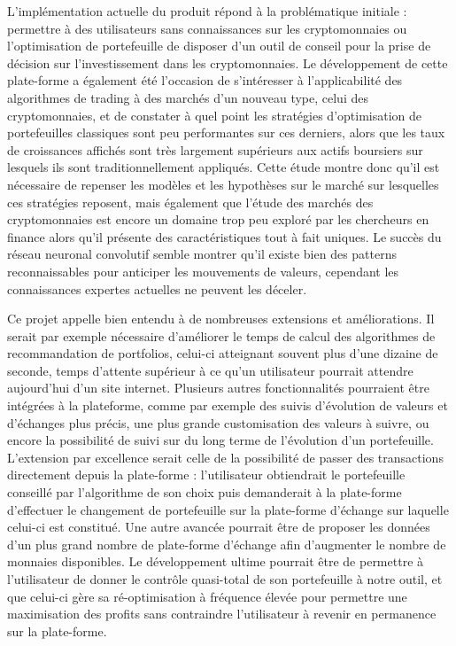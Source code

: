 \documentclass[a4paper, 10pt]{article}
\begin{document}
L'implémentation actuelle du produit répond à la problématique initiale : permettre à des utilisateurs sans connaissances sur les cryptomonnaies ou l'optimisation de portefeuille de disposer d'un outil de conseil pour la prise de décision sur l'investissement dans les cryptomonnaies. Le développement de cette plate-forme a également été l'occasion de s'intéresser à l'applicabilité des algorithmes de trading à des marchés d'un nouveau type, celui des cryptomonnaies, et de constater à quel point les stratégies d'optimisation de portefeuilles classiques sont peu performantes sur ces derniers, alors que les taux de croissances affichés sont très largement supérieurs aux actifs boursiers sur lesquels ils sont traditionnellement appliqués. Cette étude montre donc qu'il est nécessaire de repenser les modèles et les hypothèses sur le marché sur lesquelles ces stratégies reposent, mais également que l'étude des marchés des cryptomonnaies est encore un domaine trop peu exploré par les chercheurs en finance alors qu'il présente des caractéristiques tout à fait uniques. Le succès du réseau neuronal convolutif semble montrer qu'il existe bien des patterns reconnaissables pour anticiper les mouvements de valeurs, cependant les connaissances expertes actuelles ne peuvent les déceler.

Ce projet appelle bien entendu à de nombreuses extensions et améliorations. Il serait par exemple nécessaire d'améliorer le temps de calcul des algorithmes de recommandation de portfolios, celui-ci atteignant souvent plus d'une dizaine de seconde, temps d’attente supérieur à ce qu'un utilisateur pourrait attendre aujourd'hui d'un site internet. Plusieurs autres fonctionnalités pourraient être intégrées à la plateforme, comme par exemple des suivis d'évolution de valeurs et d'échanges plus précis, une plus grande customisation des valeurs à suivre, ou encore la possibilité de suivi sur du long terme de l'évolution d'un portefeuille. L'extension par excellence serait celle de la possibilité de passer des transactions directement depuis la plate-forme : l'utilisateur obtiendrait le portefeuille conseillé par l'algorithme de son choix puis demanderait à la plate-forme d'effectuer le changement de portefeuille sur la plate-forme d'échange sur laquelle celui-ci est constitué. Une autre avancée pourrait être de proposer les données d'un plus grand nombre de plate-forme d'échange afin d'augmenter le nombre de monnaies disponibles. Le développement ultime pourrait être de permettre à l'utilisateur de donner le contrôle quasi-total de son portefeuille à notre outil, et que celui-ci gère sa ré-optimisation à fréquence élevée pour permettre une maximisation des profits sans contraindre l'utilisateur à revenir en permanence sur la plate-forme.

\newpage
\printbibliography[heading=bibintoc]
\end{document}
